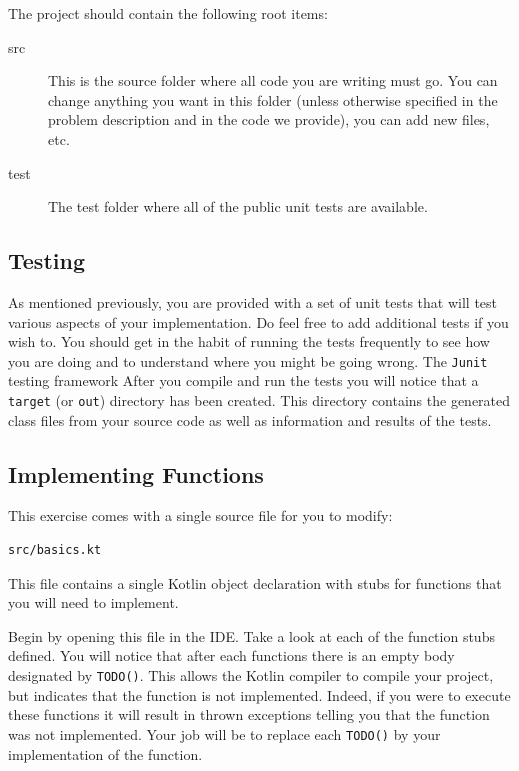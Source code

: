 \documentclass[12pt,a4paper]{exam}
\begin{document}
The project should contain the following root items:
\begin{description}
\item[src]
This is the source folder where all code you are writing must go. 
You can change anything you want in this folder (unless otherwise specified in the problem description and 
in the code we provide), you can add new files, etc.	

\item[test]
The test folder where all of the public unit tests are available.
\end{description}

\subsection*{Testing}

As mentioned previously, you are provided with a set of unit tests that will test various aspects of 
your implementation. Do feel free to add additional tests if you wish to.
You should get in the habit of running the tests frequently to see how you are doing and to understand 
where you might be going wrong. The \verb!Junit! testing framework 
After you compile and run the tests you will notice that a \verb!target! (or \verb!out!) directory has been created. 
This directory contains the generated class files from your source code as 
well as information and results of the tests. 

\subsection*{Implementing Functions}

This exercise comes with a single source file for you to modify:
\begin{Verbatim}
src/basics.kt
\end{Verbatim}
This file contains a single Kotlin object declaration with stubs for functions that you will need to implement.

Begin by opening this file in the IDE. Take a look at each of the function stubs defined. 
You will notice that after each functions there is an empty body designated by \verb!TODO()!. 
This allows the Kotlin compiler to compile your project, but indicates that the function is not implemented. 
Indeed, if you were to execute these functions it will result in thrown exceptions telling you that the 
function was not implemented. Your job will be to replace each \verb!TODO()! 
by your implementation of the function.
\end{document}
